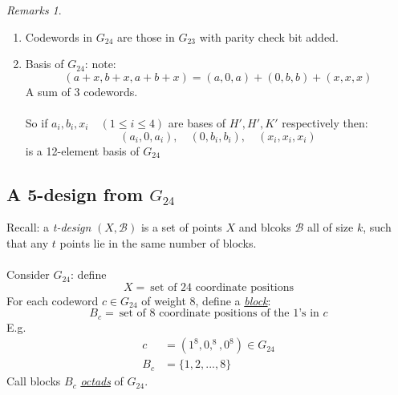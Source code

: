 \documentclass[]{article}
\theoremstyle{definition}
\theoremstyle{remark}
\newtheorem*{rems}{Remarks}
\numberwithin{equation}{section}
\begin{document}
		\begin{rems} \hfill \\
			\begin{enumerate}
				\item
					Codewords in $G_{24}$ are those in $G_{23}$ with parity check bit added.
				\item
					Basis of $G_{24}$: note:
					\[
						(a+x, b+x, a+b+x) = (a,0,a) + (0,b,b) + (x,x,x)
					\]
					A sum of 3 codewords.\\
					\\
					So if $a_i, b_i, x_i \quad (1\leq i \leq 4)$ are bases of $H', H', K' $ respectively then:
					\[
						(a_i, 0, a_i), \quad (0,b_i,b_i), \quad (x_i,x_i, x_i)
					\]
					is a 12-element basis of $G_{24}$
			\end{enumerate}
		\end{rems}
	\subsection{A 5-design from \texorpdfstring{$G_{24}$}{G24}}
		Recall: a \emph{t-design} $(X, \mathscr{B})$ is a set of points $X$ and blcoks $\mathscr{B}$ all of size $k$, such that any $t$ points lie in the same number of blocks.\\
		\\

		Consider $G_{24}$: define
		\[
			X = \ \text{set of 24 coordinate positions}
		\]
		For each codeword $c \in G_{24} $ of weight 8, define a \underline{\emph{block}}:
		\[
			B_c = \ \text{set of 8 coordinate positions of the 1's in $c$}
		\]
		E.g.
		\begin{align*}
			c &= (1^8, 0,^8, 0^8) \in G_{24}\\
			B_c &= \{1,2, ... , 8\}
		\end{align*}
		Call blocks $B_c$ \underline{\emph{octads}} of $G_{24}$.
\end{document}
